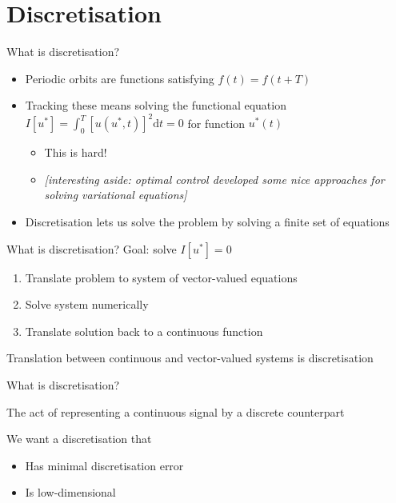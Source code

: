 \documentclass[presentation]{beamer}
\begin{document}
\section{Discretisation}
\label{sec:org3734515}
\begin{frame}[label={sec:orgcadc1ae}]{What is discretisation?}
\begin{itemize}[<+->]
\item Periodic orbits are functions satisfying \(f(t) = f(t+T)\)
\item Tracking these means solving the functional equation \(I\left[u^*\right] = \int_0^T\left[u(u^*, t)\right]^2\mathrm{d}t = 0\) for function \(u^*(t)\)
\begin{itemize}
\item This is hard!
\item \emph{[interesting aside: optimal control developed some nice approaches for solving variational equations]}
\end{itemize}
\item Discretisation lets us solve the problem by solving a finite set of equations
\end{itemize}
\end{frame}

\begin{frame}[label={sec:orgec67196}]{What is discretisation?}
Goal: solve \(I\left[u^*\right] = 0\)
\begin{enumerate}
\item Translate problem to system of vector-valued equations
\item Solve system numerically
\item Translate solution back to a continuous function
\end{enumerate}

\vfill
Translation between continuous and vector-valued systems is discretisation
\end{frame}

\begin{frame}[label={sec:orgce31744}]{What is discretisation?}
\begin{definition}[Discretisation]
The act of representing a continuous signal by a discrete counterpart
\end{definition}

\vfill
We want a discretisation that
\begin{itemize}
\item Has minimal discretisation error
\item Is low-dimensional
\end{itemize}
\end{frame}
\end{document}
